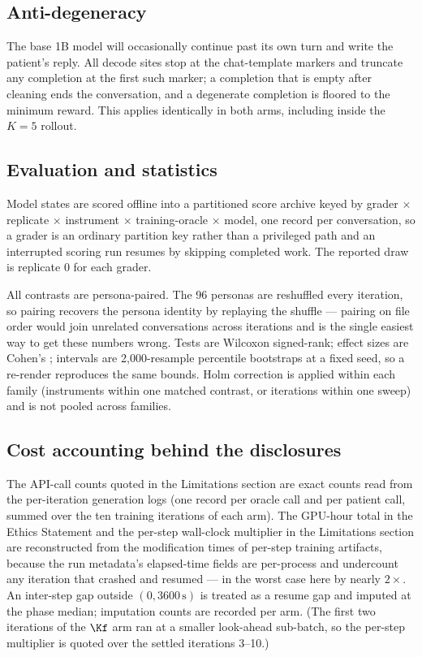 \subsection{Anti-degeneracy}

The base 1B model will occasionally continue past its own turn and write the patient's reply. All
decode sites stop at the chat-template markers and truncate any completion at the first such
marker; a completion that is empty after cleaning ends the conversation, and a degenerate
completion is floored to the minimum reward. This applies identically in both arms, including
inside the $K{=}5$ rollout.

\subsection{Evaluation and statistics}

Model states are scored offline into a partitioned score archive keyed by
grader $\times$ replicate $\times$ instrument $\times$ training-oracle $\times$ model, one record
per conversation, so a grader is an ordinary partition key rather than a privileged path and an
interrupted scoring run resumes by skipping completed work. The reported draw is replicate 0 for
each grader.

All contrasts are persona-paired. The 96 personas are reshuffled every iteration, so pairing
recovers the persona identity by replaying the shuffle --- pairing on file order would join
unrelated conversations across iterations and is the single easiest way to get these numbers
wrong. Tests are Wilcoxon signed-rank; effect sizes are Cohen's \dz; intervals are 2{,}000-resample
percentile bootstraps at a fixed seed, so a re-render reproduces the same bounds. Holm correction
is applied within each family (instruments within one matched contrast, or iterations within one
sweep) and is not pooled across families.

\subsection{Cost accounting behind the disclosures}

The API-call counts quoted in the Limitations section are exact counts read from the per-iteration
generation logs (one record per oracle call and per patient call, summed over the ten training
iterations of each arm). The GPU-hour total in the Ethics Statement and the per-step wall-clock
multiplier in the Limitations section are reconstructed from the modification times of per-step
training artifacts, because the run metadata's elapsed-time fields are per-process and undercount
any iteration that crashed and resumed --- in the worst case here by nearly $2\times$. An
inter-step gap outside $(0, 3600\,\mathrm{s})$ is treated as a resume gap and imputed at the phase
median; imputation counts are recorded per arm. (The first two iterations of the $\Kf$ arm ran at
a smaller look-ahead sub-batch, so the per-step multiplier is quoted over the settled iterations
3--10.)


